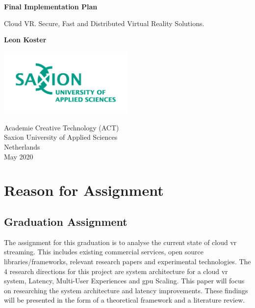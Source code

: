 \documentclass[]{article}
\begin{document}
\begin{titlepage}
   \begin{center}
       \vspace*{1cm}

       \textbf{Final Implementation Plan}

       \vspace{0.5cm}
       Cloud VR. Secure, Fast and Distributed Virtual Reality Solutions.
       \vspace{1.5cm}

       \textbf{Leon Koster}

       \vfill
            
       \vspace{0.8cm}
     
      \includegraphics[width=0.5\textwidth]{university}
            
       Academie Creative Technology (ACT)\\
       Saxion University of Applied Sciences\\
       Netherlands\\
       May 2020
            
   \end{center}
\end{titlepage}

\tableofcontents
\printnoidxglossary[type=\acronymtype]



\newpage
\section{Reason for Assignment}
\subsection{Graduation Assignment}
The assignment for this graduation is to analyse the current state of cloud \acrshort{vr} streaming. This includes existing commercial services, open source libraries/frameworks, relevant research papers and experimental technologies. The 4 research directions for this project are system architecture for a cloud \acrshort{vr} system, Latency, Multi-User Experiences and \acrshort{gpu} Scaling. This paper will focus on researching the system architecture and latency improvements. These findings will be presented in the form of a theoretical framework and a literature review.
\end{document}
